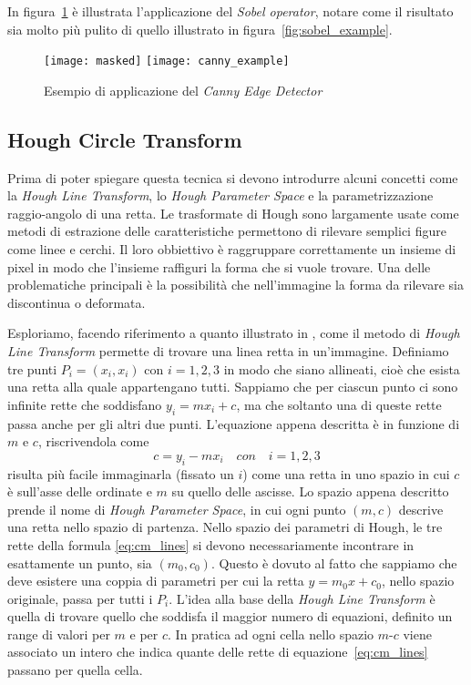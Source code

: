 In figura~\ref{fig:canny_example} è illustrata l'applicazione del \textit{Sobel operator}, notare come il risultato sia molto più pulito di quello illustrato in figura~\ref{fig:sobel_example}.
\begin{figure}[ht]
  \begin{center}
    \texttt{[image: masked]}
    \texttt{[image: canny\_example]}
    \caption{Esempio di applicazione del \textit{Canny Edge Detector}}
    \label{fig:canny_example}
  \end{center}
\end{figure}

\subsection {Hough Circle Transform}
Prima di poter spiegare questa tecnica si devono introdurre alcuni concetti come la \textit{Hough Line Transform}, lo \textit{Hough Parameter Space} e la parametrizzazione raggio-angolo di una retta.
Le trasformate di Hough sono largamente usate come metodi di estrazione delle caratteristiche permettono di rilevare semplici figure come linee e cerchi.
Il loro obbiettivo è raggruppare correttamente un insieme di pixel in modo che l'insieme raffiguri la forma che si vuole trovare.
Una delle problematiche principali è la possibilità che nell'immagine la forma da rilevare sia discontinua o deformata.

Esploriamo, facendo riferimento a quanto illustrato in \cite{hough-line}, come il metodo di \textit{Hough Line Transform} permette di trovare una linea retta in un'immagine.
Definiamo tre punti $P_i=(x_i, x_i)$ con $i=1,2,3$ in modo che siano allineati, cioè che esista una retta alla quale appartengano tutti.
Sappiamo che per ciascun punto ci sono infinite rette che soddisfano $y_i = m x_i + c$, ma che soltanto una di queste rette passa anche per gli altri due punti.
L'equazione appena descritta è in funzione di $m$ e $c$, riscrivendola come
\begin{equation} \label{eq:cm_lines}
  c = y_i - m x_i \quad con \quad i=1,2,3
\end{equation}
risulta più facile immaginarla (fissato un $i$) come una retta in uno spazio in cui $c$ è sull'asse delle ordinate e $m$ su quello delle ascisse.
Lo spazio appena descritto prende il nome di \textit{Hough Parameter Space}, in cui ogni punto $(m,c)$ descrive una retta nello spazio di partenza.
Nello spazio dei parametri di Hough, le tre rette della formula \ref{eq:cm_lines} si devono necessariamente incontrare in esattamente un punto, sia $(m_0,c_0)$.
Questo è dovuto al fatto che sappiamo che deve esistere una coppia di parametri per cui la retta $y = m_0 x + c_0$, nello spazio originale, passa per tutti i $P_i$.
L'idea alla base della \textit{Hough Line Transform} è quella di trovare quello che soddisfa il maggior numero di equazioni, definito un range di valori per $m$ e per $c$.
In pratica ad ogni cella nello spazio $m$-$c$ viene associato un intero che indica quante delle rette di equazione~\ref{eq:cm_lines} passano per quella cella.

